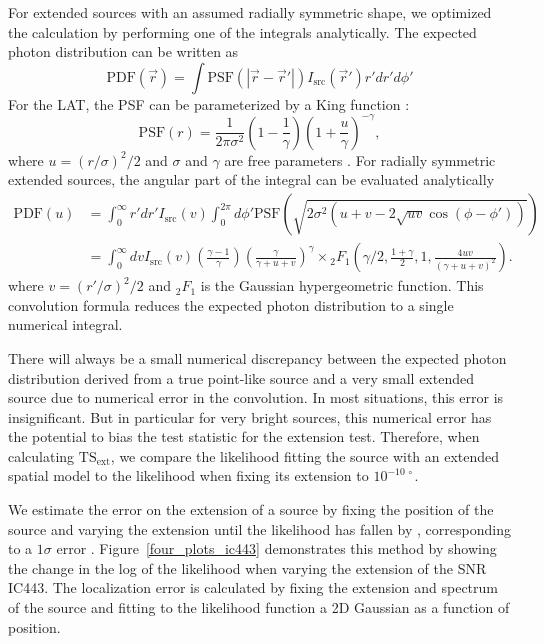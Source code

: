 \documentclass[12pt,preprint]{aastex}
\newcommand{\tsext}{{\ensuremath{\text{TS}_{\text{ext}}}}\xspace}
\begin{document}
For extended sources with an assumed radially symmetric shape,
we optimized the calculation by performing one
of the integrals analytically.
The expected photon 
distribution can be written as
\begin{equation}
  \text{PDF}(\vec r) = \int  \text{PSF}(|\vec r - \vec r'|)I_\text{src}(\vec r') r' dr' d\phi'
\end{equation}
For the LAT, the PSF can be parameterized by a King function \citep{king_function}:
\begin{equation}
  \text{PSF}(r) = 
  \frac{1}{2\pi\sigma^2}
  \left(1-\frac{1}{\gamma}\right)
  \left(1+\frac{u}{\gamma}\right)^{-\gamma},
\end{equation}
where $u=(r/\sigma)^2/2$ and $\sigma$ and $\gamma$ are free parameters
\citep{matthew_kerr_thesis}.  For radially symmetric extended sources,
the angular part of the integral can be evaluated analytically
\begin{align}
  \text{PDF}(u) & = \int_0^\infty r' dr'
  I_\text{src}(v) 
  \int_0^{2\pi} d\phi' 
  \text{PSF}(\sqrt{2\sigma^2(u+v-2\sqrt{uv}\cos(\phi-\phi'))})
  \\
  & = \int_0^\infty dv
  I_\text{src}(v) 
  \left(\frac{\gamma-1}{\gamma}\right)
  \left( \frac{\gamma}{\gamma + u + v}\right)^\gamma 
  \times {}_2F_1 \left(\gamma/2,\frac{1+\gamma}{2},1,\frac{4uv}{(\gamma+u+v)^2}\right).
\end{align}
where $v=(r'/\sigma)^2/2$ and ${}_2F_1$ is the Gaussian hypergeometric
function.  This convolution formula reduces the expected photon
distribution to a single numerical integral.

There will always be a small numerical discrepancy between the expected
photon distribution derived from a true point-like source and a very small
extended source due to numerical error in the convolution.  In most
situations, this error is insignificant.  But in particular for
very bright sources, this numerical error has the potential to bias the
test statistic for the extension test. Therefore, when calculating
\tsext, we compare the likelihood fitting the source with an extended
spatial model to the likelihood when fixing its extension to $10^{-10\,\circ}$.

We estimate the error on the extension of a source by fixing
the position of the source and varying the extension until the
likelihood has fallen by \onehalf, corresponding to a $1\sigma$ error
\citep{Statistical_methods_book}.  Figure~\ref{four_plots_ic443}
demonstrates this method by showing the change in the log of the
likelihood when varying the extension of the SNR IC443.  The localization
error is calculated by fixing the extension and spectrum of the source
and fitting to the likelihood function a 2D Gaussian as a function
of position.
\end{document}
